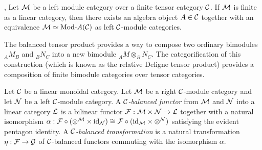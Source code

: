 \documentclass{amsart}
\begin{document}
\begin{theorem}{\cite[Thm 2.11.6]{EGNO}, \cite[Thm 1]{MR1976459}} \label{thm:EGNO2.11.6}
	Let $\mathcal M$ be a left module category over a finite tensor category $\mathcal C$. If $\mathcal M$ is finite as a linear category, then there exists an algebra object $A \in \mathcal C$ together with an equivalence $\cM \simeq \Mod{}{A} (\cC)$ as left $\mathcal C$-module categories.
\end{theorem}




The balanced tensor product provides a way to compose two ordinary bimodules $_A M_B$ and $_B N_C$ into a new bimodule $_A M \otimes_B N_C$.  The categorification of this construction (which is known as the relative Deligne tensor product) provides a composition of finite bimodule categories over tensor categories.

\begin{definition}
	Let $\mathcal C$ be a linear monoidal category. 
	Let $\mathcal M$ be a right $\mathcal C$-module category and let $\mathcal N$ be a left $\mathcal C$-module category. A {\em $\mathcal C$-balanced functor} from $\mathcal M$ and $\mathcal N$ into a linear category $\mathcal L$ is a bilinear functor $\mathcal F: \mathcal M \times \mathcal N \to \mathcal L$ together with a natural isomorphism $\alpha: \mathcal F \circ (\otimes^{\mathcal M} \times \mathrm{id}_{\mathcal N}) \cong \mathcal F \circ (\mathrm{id}_{\mathcal M} \times \otimes^{\mathcal N})$ satisfying the evident pentagon identity. A {\em $\mathcal C$-balanced transformation} is a natural transformation $\eta:\mathcal F \to \mathcal G$ of $\mathcal C$-balanced functors commuting with the isomorphism $\alpha$.
\end{definition}
\end{document}
